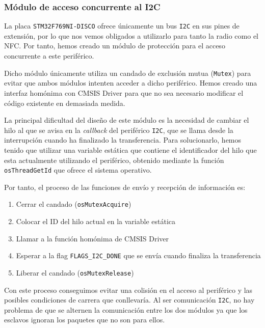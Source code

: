 \subsubsection{Módulo de acceso concurrente al I2C}\label{subsec:i2c}

La placa \texttt{STM32F769NI-DISCO} ofrece únicamente un bus \texttt{I2C} en sus pines de extensión, por lo que nos vemos obligados a utilizarlo para tanto la radio como el NFC. Por tanto, hemos creado un módulo de protección para el acceso concurrente a este periférico. 

Dicho módulo únicamente utiliza un candado de exclusión mutua (\texttt{Mutex}) para evitar que ambos módulos intenten acceder a dicho periférico. Hemos creado una interfaz homónima con CMSIS Driver para que no sea necesario modificar el código existente en demasiada medida.

La principal dificultad del diseño de este módulo es la necesidad de cambiar el hilo al que se avisa en la \textit{callback} del periférico \texttt{I2C}, que se llama desde la interrupción cuando ha finalizado la transferencia. Para solucionarlo, hemos tenido que utilizar una variable estática que contiene el identificador del hilo que esta actualmente utilizando el periférico, obtenido mediante la función \texttt{osThreadGetId} que ofrece el sistema operativo.

Por tanto, el proceso de las funciones de envío y recepción de información es:
\begin{enumerate}
    \item Cerrar el candado (\texttt{osMutexAcquire})
    \item Colocar el ID del hilo actual en la variable estática
    \item Llamar a la función homónima de CMSIS Driver
    \item Esperar a la flag \texttt{FLAGS\_I2C\_DONE} que se envía cuando finaliza la transferencia
    \item Liberar el candado (\texttt{osMutexRelease})
\end{enumerate}

Con este proceso conseguimos evitar una colisión en el acceso al periférico y las posibles condiciones de carrera que conllevaría. Al ser comunicación \texttt{I2C}, no hay problema de que se alternen la comunicación entre los dos módulos ya que los esclavos ignoran los paquetes que no son para ellos.
